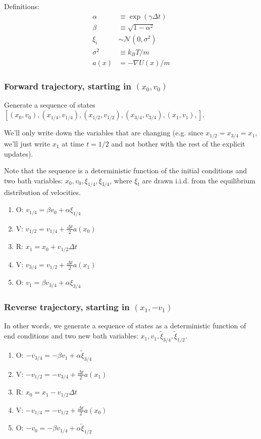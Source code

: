 \documentclass[11pt]{article}
\begin{document}
Definitions:
$$ \begin{aligned}
\alpha &\equiv \exp (\gamma \Delta t)\\
\beta &\equiv \sqrt{1 - \alpha^2}\\
\xi_i &\sim \mathcal{N}(0, \sigma^2)\\
\sigma^2 &\equiv k_B T / m\\
a(x) &= -\nabla U(x) / m
\end{aligned} $$

\subsubsection{Forward trajectory, starting in $(x_0, v_0)$}
Generate a sequence of states
$[(x_0, v_0),
(x_{1/4}, v_{1/4}),
(x_{1/2}, v_{1/2}),
(x_{3/4}, v_{3/4}),
(x_1, v_1),
]$.

We'll only write down the variables that are changing (e.g. since $x_{1/2}=x_{3/4}=x_1$, we'll just write $x_1$ at time $t=1/2$ and not bother with the rest of the explicit updates).

Note that the sequence is a deterministic function of the initial conditions and two bath variables: $x_0, v_0, \xi_{1/4}, \xi_{3/4}$, where $\xi_t$ are drawn i.i.d. from the equilibrium distribution of velocities.

\begin{enumerate}
\item O: $v_{1/4} = \beta v_0 + \alpha \xi_{1/4}$
\item V: $v_{1/2} = v_{1/4} + \frac{\Delta t}{2} a(x_0)$
\item R: $x_1 = x_0 + v_{1/2} \Delta t$
\item V: $v_{3/4} = v_{1/2} + \frac{\Delta t}{2} a(x_1)$
\item O: $v_{1} = \beta v_{3/4} + \alpha \xi_{3/4}$
\end{enumerate}

\subsubsection{Reverse trajectory, starting in $(x_1, -v_1)$}
In other words, we generate a sequence of states as a deterministic function of end conditions and two new bath variables: $x_1, v_1, \tilde{\xi}_{3/4}, \tilde{\xi}_{1/2}$.

\begin{enumerate}
\item O: $-v_{3/4} = - \beta v_1 + \alpha \tilde{\xi}_{3/4}$
\item V: $-v_{1/2} = -v_{3/4} + \frac{\Delta t}{2} a(x_1)$
\item R: $x_0 = x_1 - v_{1/2} \Delta t$
\item V: $-v_{1/4} = -v_{1/2} + \frac{\Delta t}{2} a(x_0)$
\item O: $-v_{0} = - \beta v_{1/4} + \alpha \tilde{\xi}_{1/2}$
\end{enumerate}
\end{document}
